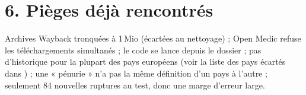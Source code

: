 \section{6. Pièges déjà rencontrés}
Archives Wayback tronquées à 1\,Mio (écartées au nettoyage) ; Open Medic refuse les téléchargements simultanés ; le code se lance depuis le
dossier  ; pas d'historique pour la plupart des pays européens (voir la liste des pays écartés dans ) ; une
« pénurie » n'a pas la même définition d'un pays à l'autre ; seulement 84 nouvelles ruptures au test, donc une marge d'erreur large.
